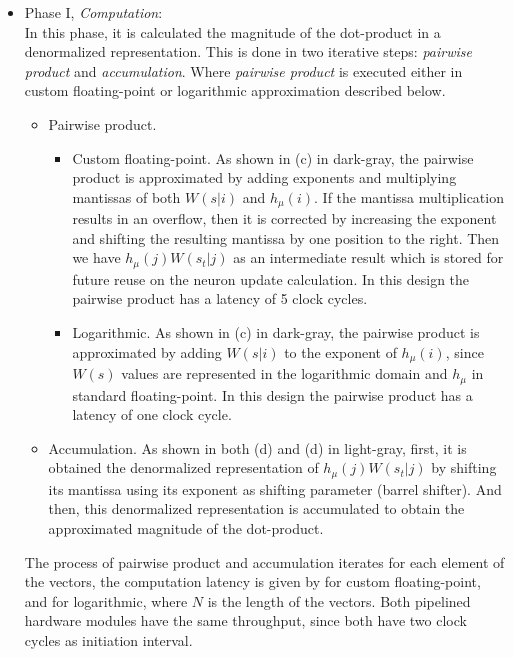  \begin{itemize}
 	\item{Phase I, \emph{Computation}}: 
 	\\In this phase, it is calculated the magnitude of the dot-product in a denormalized representation. This is done in two iterative steps: \emph{pairwise product} and \emph{accumulation}. Where \emph{pairwise product} is executed either in custom floating-point or logarithmic approximation described below.
 	 \begin{itemize}[label={--}]
 	 	\item{Pairwise product}.
 	 	\begin{itemize} [label={--}]
	 		\item{Custom floating-point}.
	 	 	As shown in (c) in dark-gray, the pairwise product is approximated by adding exponents and multiplying mantissas of both $W(s|i)$ and $h_\mu(i)$. If the mantissa multiplication results in an overflow, then it is corrected by increasing the  exponent and shifting the resulting mantissa by one position to the right. Then we have $h_\mu(j) W(s_t|j)$ as an intermediate result which is stored for future reuse on the neuron update calculation. In this design the pairwise product has a latency of 5 clock cycles.
	 	 	\item{Logarithmic}.
	 	 	As shown in (c) in dark-gray, the pairwise product is approximated by adding $W(s|i)$ to the exponent of $h_\mu(i)$, since $W(s)$ values are represented in the logarithmic domain and $h_\mu$ in standard floating-point. In this design the pairwise product has a latency of one clock cycle.
 	 	\end{itemize}
 		\item{Accumulation}. As shown in both (d) and (d) in light-gray, first, it is obtained the denormalized representation of $h_\mu(j) W(s_t|j)$ by shifting its mantissa using its exponent as shifting parameter (barrel shifter). And then, this denormalized representation is accumulated to obtain the approximated magnitude of the dot-product.
 	 \end{itemize}
 	The process of pairwise product and accumulation iterates for each element of the vectors, the computation latency is given by  for custom floating-point, and  for logarithmic, where $N$ is the length of the vectors. Both pipelined hardware modules have the same throughput, since both have two clock cycles as initiation interval.
 	

\end{itemize}
